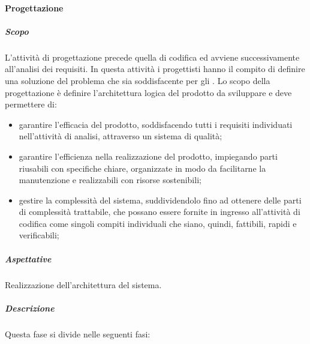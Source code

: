 			\paragraph {Progettazione}
				\subparagraph{Scopo}
					L'attività di progettazione precede quella di codifica ed avviene successivamente all'analisi dei requisiti.
					\newline
					In questa attività i progettisti hanno il compito di definire una soluzione del problema che sia soddisfacente per gli . 
					\newline
					Lo scopo della progettazione è definire l'architettura logica del prodotto da sviluppare e deve permettere di:
					\begin{itemize}
						\item garantire l'efficacia del prodotto, soddisfacendo tutti i requisiti individuati nell'attività di analisi, attraverso un sistema di qualità;
						\item garantire l'efficienza nella realizzazione del prodotto, impiegando parti riusabili con specifiche chiare, organizzate in modo da facilitarne la manutenzione e realizzabili con risorse sostenibili;
						\item gestire la complessità del sistema, suddividendolo fino ad ottenere delle parti di complessità trattabile, che possano essere fornite in ingresso all'attività di codifica come singoli compiti individuali che siano, quindi, fattibili, rapidi e verificabili;
					\end{itemize}	
				\subparagraph{Aspettative}
					Realizzazione dell'architettura del sistema.
				\subparagraph{Descrizione}
					Questa fase si divide nelle seguenti fasi: 
